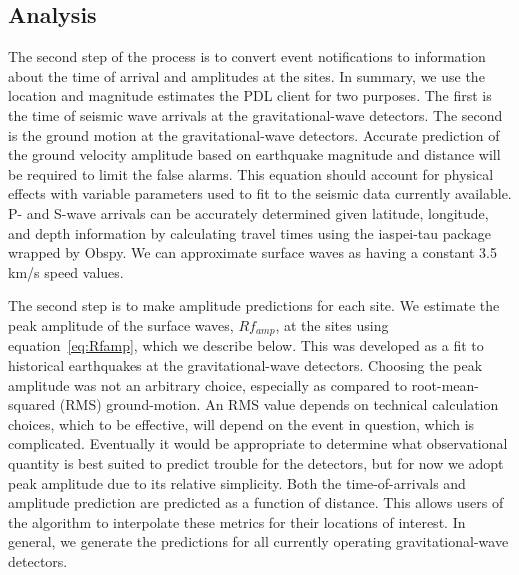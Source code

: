 \documentclass[reprint, prl, aps, showpacs]{revtex4-1}
\begin{document}
\subsection{Analysis}

The second step of the process is to convert event notifications to information about the time of arrival and amplitudes at the sites.
In summary, we use the location and magnitude estimates the PDL client for two purposes. 
The first is the time of seismic wave arrivals at the gravitational-wave detectors.
The second is the ground motion at the gravitational-wave detectors.
Accurate prediction of the ground velocity amplitude based on earthquake magnitude and distance will be required to limit the false alarms. 
This equation should account for physical effects with variable parameters used to fit to the seismic data currently available.
P- and S-wave arrivals can be accurately determined given latitude, longitude, and depth information by calculating travel times using the iaspei-tau package wrapped by Obspy. We can approximate surface waves as having a constant 3.5\,km/s speed values. 

The second step is to make amplitude predictions for each site. 
We estimate the peak amplitude of the surface waves, $Rf_{amp}$, at the sites using equation~\ref{eq:Rfamp}, which we describe below. This was developed as a fit to historical earthquakes at the gravitational-wave detectors.
Choosing the peak amplitude was not an arbitrary choice, especially as compared to root-mean-squared (RMS) ground-motion.
An RMS value depends on technical calculation choices, which to be effective, will depend on the event in question, which is complicated.
Eventually it would be appropriate to determine what observational quantity is best suited to predict trouble for the detectors, but for now we adopt peak amplitude due to its relative simplicity.
Both the time-of-arrivals and amplitude prediction are predicted as a function of distance. This allows users of the algorithm to interpolate these metrics for their locations of interest. In general, we generate the predictions for all currently operating gravitational-wave detectors.
\end{document}
